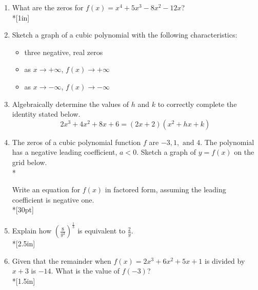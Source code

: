 \documentclass[12pt, oneside]{article}
\begin{document}
\begin{enumerate}
\item What are the zeros for $f(x)=x^4+5x^3-8x^2-12x$? \\*[1in]  

\newpage 

\item Sketch a graph of a cubic polynomial with the following characteristics: 
\begin{itemize}
\item three negative, real zeros
\item as $x \rightarrow + \infty$, $f(x) \rightarrow + \infty$
\item as $x \rightarrow - \infty$, $f(x) \rightarrow - \infty$
\end{itemize}
\begin{center}
\end{center} %


\item Algebraically determine the values of $h$ and $k$ to correctly complete the identity stated below.
\[2x^3+4x^2+8x+6=(2x+2)(x^2+hx+k)\] %

\newpage 
\item The zeros of a cubic polynomial function $f$ are  $-3, 1, \text{ and } 4$. The polynomial has a negative leading coefficient, $a<0$. Sketch a graph of $y = f(x)$ on the grid below.\\*
\begin{center}
\end{center}
Write an equation for $f(x)$ in factored form, assuming the leading coefficient is negative one.\\*[30pt]

\newpage

\item Explain how $\displaystyle \left( \frac{8}{y^3} \right)^\frac{1}{3}$ is equivalent to $\displaystyle \frac{2}{y}$. \\*[2.5in]


\item Given that the remainder when  $f(x)=2x^3+6x^2+5x+1$ is divided by $x+3$ is $-14$. What is the value of $f(-3)$? \\*[1.5in]


\end{enumerate}
\end{document}

